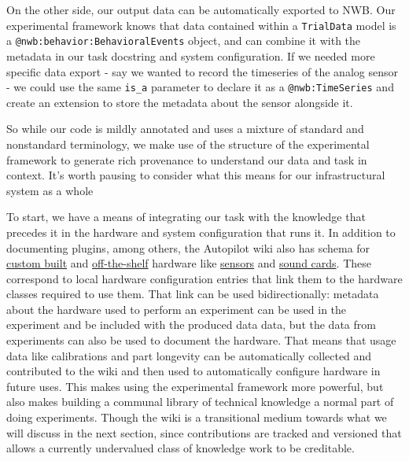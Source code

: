 On the other side, our output data can be automatically exported to
NWB. Our
experimental framework knows that data contained within a
\texttt{TrialData} model is a \texttt{@nwb:behavior:BehavioralEvents}
object, and can combine it with the metadata in our task docstring and
system configuration. If we needed more specific data export - say we
wanted to record the timeseries of the analog sensor - we could use the
same \texttt{is\_a} parameter to declare it as a
\texttt{@nwb:TimeSeries} and create an extension to store the metadata
about the sensor alongside it.

So while our code is mildly annotated and uses a mixture of standard and
nonstandard terminology, we make use of the structure of the
experimental framework to generate rich provenance to understand our
data and task in context. It's worth pausing to consider what this means
for our infrastructural system as a whole

To start, we have a means of integrating our task with the knowledge
that precedes it in the hardware and system configuration that runs it.
In addition to documenting plugins, among others, the Autopilot wiki
also has schema for
\href{https://wiki.auto-pi-lot.com/index.php/Autopilot_Behavior_Box}{custom
built} and
\href{https://wiki.auto-pi-lot.com/index.php/Parts}{off-the-shelf}
hardware like
\href{https://wiki.auto-pi-lot.com/index.php/TT_Electronics_OPB901L55}{sensors}
and \href{https://wiki.auto-pi-lot.com/index.php/HiFiBerry_Amp2}{sound
cards}. These correspond to local hardware configuration entries that
link them to the hardware classes required to use them. That link can
be used bidirectionally: metadata about the hardware used to perform an
experiment can be used in the experiment and be included with the
produced data data, but the data from experiments can also be used to
document the hardware. That means that usage data like calibrations and
part longevity can be automatically collected and contributed to the
wiki and then used to automatically configure hardware in future uses.
This makes using the experimental framework more powerful, but also
makes building a communal library of technical knowledge a normal part
of doing experiments. Though the wiki is a transitional medium towards
what we will discuss in the next section, since contributions are
tracked and versioned that allows a currently undervalued class of
knowledge work to be creditable.

